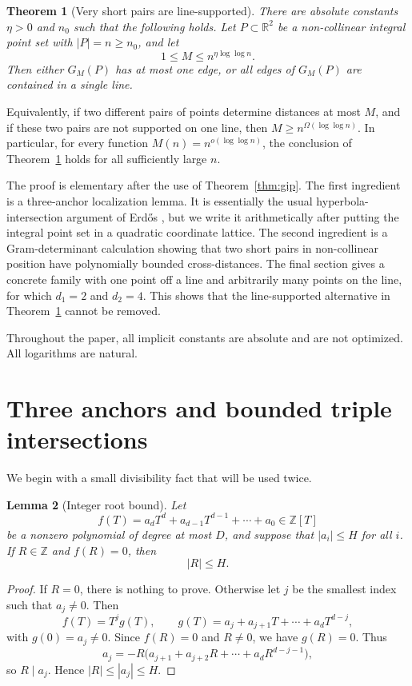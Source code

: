 \documentclass[11pt]{article}
\newtheorem{theorem}{Theorem}[section]
\newtheorem{lemma}[theorem]{Lemma}
\newcommand{\ZZ}{\mathbb Z}
\newcommand{\RR}{\mathbb R}
\begin{document}
\begin{theorem}[Very short pairs are line-supported]\label{thm:main}
There are absolute constants \(\eta>0\) and \(n_0\) such that the following
holds.  Let \(P\subset \RR^2\) be a non-collinear integral point set with
\(|P|=n\ge n_0\), and let
\[
        1\le M\le n^{\eta\log\log n}.
\]
Then either \(G_M(P)\) has at most one edge, or all edges of \(G_M(P)\) are
contained in a single line.
\end{theorem}

Equivalently, if two different pairs of points determine distances at most
\(M\), and if these two pairs are not supported on one line, then
\(M\ge n^{\Omega(\log\log n)}\).  In particular, for every function
\(M(n)=n^{o(\log\log n)}\), the conclusion of Theorem~\ref{thm:main} holds for
all sufficiently large \(n\).

The proof is elementary after the use of Theorem~\ref{thm:gip}.
The first ingredient is a three-anchor localization lemma.  It is essentially
the usual hyperbola-intersection argument of Erd\H{o}s \cite{Erdos1945}, but we write it arithmetically after
putting the integral point set in a quadratic coordinate lattice.  The second
ingredient is a Gram-determinant calculation showing that two short pairs in
non-collinear position have polynomially bounded cross-distances.  The final
section gives a concrete family with one point off a line and
arbitrarily many points on the line, for which \(d_1=2\) and \(d_2=4\).  This
shows that the line-supported alternative in Theorem~\ref{thm:main} cannot be
removed.

Throughout the paper, all implicit constants are absolute and are not optimized.
All logarithms are natural.

\section{Three anchors and bounded triple intersections}

We begin with a small divisibility fact that will be used twice.

\begin{lemma}[Integer root bound]\label{lem:root}
Let
\[
        f(T)=a_dT^d+a_{d-1}T^{d-1}+\cdots+a_0\in\ZZ[T]
\]
be a nonzero polynomial of degree at most \(D\), and suppose that
\(|a_i|\le H\) for all \(i\).  If \(R\in\ZZ\) and \(f(R)=0\), then
\[
        |R|\le H.
\]
\end{lemma}

\begin{proof}
If \(R=0\), there is nothing to prove.  Otherwise let \(j\) be the smallest
index such that \(a_j\ne0\).  Then
\[
        f(T)=T^jg(T),
        \qquad
        g(T)=a_j+a_{j+1}T+\cdots+a_dT^{d-j},
\]
with \(g(0)=a_j\ne0\).  Since \(f(R)=0\) and \(R\ne0\), we have \(g(R)=0\).
Thus
\[
        a_j=-R\bigl(a_{j+1}+a_{j+2}R+\cdots+a_dR^{d-j-1}\bigr),
\]
so \(R\mid a_j\).  Hence \(|R|\le |a_j|\le H\).
\end{proof}
\end{document}
